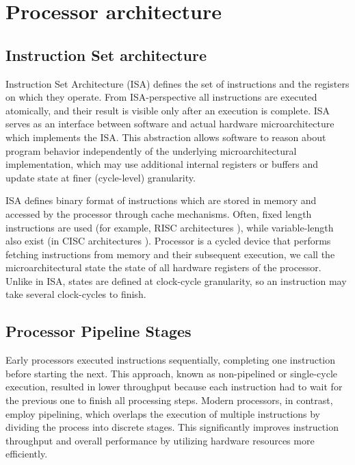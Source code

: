 \chapter{Processor architecture}

\section{Instruction Set architecture}

Instruction Set Architecture (ISA) defines the set of instructions and the registers on which they operate. From ISA-perspective all instructions are executed atomically, and their result is visible only after an execution is complete. ISA serves as an interface between software and actual hardware microarchitecture which implements the ISA. This abstraction allows software to reason about program behavior independently of the underlying microarchitectural implementation, which may use additional internal registers or buffers and update state at finer (cycle-level) granularity.


ISA defines binary format of instructions which are stored in memory and accessed by the processor through cache mechanisms. Often, fixed length instructions are used (for example, RISC architectures ), while variable-length also exist (in CISC architectures ). Processor is a cycled device that performs fetching instructions from memory and their subsequent execution, we call the microarchitectural state the state of all hardware registers of the processor. Unlike in ISA, states are defined at clock-cycle granularity, so an instruction may take several clock-cycles to finish. 


\section{Processor Pipeline Stages}

Early processors executed instructions sequentially, completing one instruction before starting the next. This approach, known as non-pipelined or single-cycle execution, resulted in lower throughput because each instruction had to wait for the previous one to finish all processing steps. Modern processors, in contrast, employ pipelining, which overlaps the execution of multiple instructions by dividing the process into discrete stages. This significantly improves instruction throughput and overall performance by utilizing hardware resources more efficiently.

